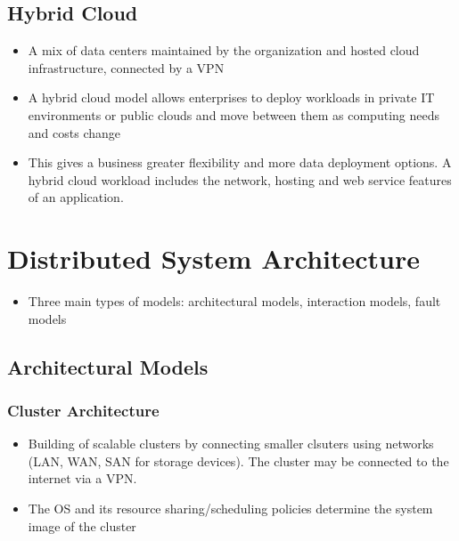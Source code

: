 \documentclass{article}
\begin{document}
\subsection{Hybrid Cloud}
\begin{itemize}
    \item A mix of data centers maintained by the organization and hosted cloud infrastructure, connected by a VPN
    
    \item A hybrid cloud model allows enterprises to deploy workloads in private IT environments or public clouds and move between them as computing needs and costs change
    
    \item This gives a business greater flexibility and more data deployment options. A hybrid cloud workload includes the network, hosting and web service features of an application.
\end{itemize}

\section{Distributed System Architecture}
\begin{itemize}
    \item Three main types of models: architectural models, interaction models, fault models
\end{itemize}
\subsection{Architectural Models}
\subsubsection{Cluster Architecture}
\begin{itemize}
    \item Building of scalable clusters by connecting smaller clsuters using networks (LAN, WAN, SAN for storage devices). The cluster may be connected to the internet via a VPN. 
    
    \item The OS and its resource sharing/scheduling policies determine the system image of the cluster
\end{itemize}
\end{document}
